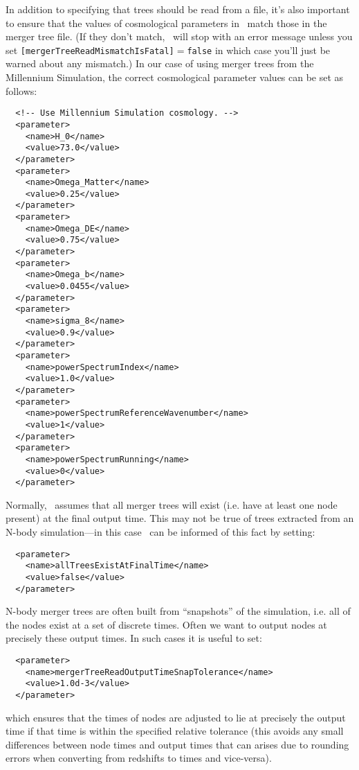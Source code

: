 In addition to specifying that trees should be read from a file, it's also important to ensure that the values of cosmological parameters in \glc\ match those in the merger tree file. (If they don't match, \glc\ will stop with an error message unless you set {\tt [mergerTreeReadMismatchIsFatal]}$=${\tt false} in which case you'll just be warned about any mismatch.) In our case of using merger trees from the Millennium Simulation, the correct cosmological parameter values can be set as follows:
\begin{verbatim}
  <!-- Use Millennium Simulation cosmology. -->
  <parameter>
    <name>H_0</name>
    <value>73.0</value>
  </parameter>
  <parameter>
    <name>Omega_Matter</name>
    <value>0.25</value>
  </parameter>
  <parameter>
    <name>Omega_DE</name>
    <value>0.75</value>
  </parameter>
  <parameter>
    <name>Omega_b</name>
    <value>0.0455</value>
  </parameter>
  <parameter>
    <name>sigma_8</name>
    <value>0.9</value>
  </parameter>
  <parameter>
    <name>powerSpectrumIndex</name>
    <value>1.0</value>
  </parameter>
  <parameter>
    <name>powerSpectrumReferenceWavenumber</name>
    <value>1</value>
  </parameter>
  <parameter>
    <name>powerSpectrumRunning</name>
    <value>0</value>
  </parameter>
\end{verbatim}

Normally, \glc\ assumes that all merger trees will exist (i.e. have at least one node present) at the final output time. This may not be true of trees extracted from an N-body simulation---in this case \glc\ can be informed of this fact by setting:
\begin{verbatim}
  <parameter>
    <name>allTreesExistAtFinalTime</name>
    <value>false</value>
  </parameter>
\end{verbatim}

N-body merger trees are often built from ``snapshots'' of the simulation, i.e. all of the nodes exist at a set of discrete times. Often we want to output nodes at precisely these output times. In such cases it is useful to set:
\begin{verbatim}
  <parameter>
    <name>mergerTreeReadOutputTimeSnapTolerance</name>
    <value>1.0d-3</value>
  </parameter>
\end{verbatim}
which ensures that the times of nodes are adjusted to lie at precisely the output time if that time is within the specified relative tolerance (this avoids any small differences between node times and output times that can arises due to rounding errors when converting from redshifts to times and vice-versa).

